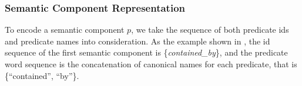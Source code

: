 \subsubsection{Semantic Component Representation}
\label{sec:schema-encoding}





To encode a semantic component $p$, we take the sequence of both predicate ids
and predicate names into consideration.
As the example shown in , the id sequence of the first semantic component
is \{\textit{contained\_by}\}, 
and the predicate word sequence is the concatenation of canonical names for each predicate,
that is \{``contained'', ``by''\}.

